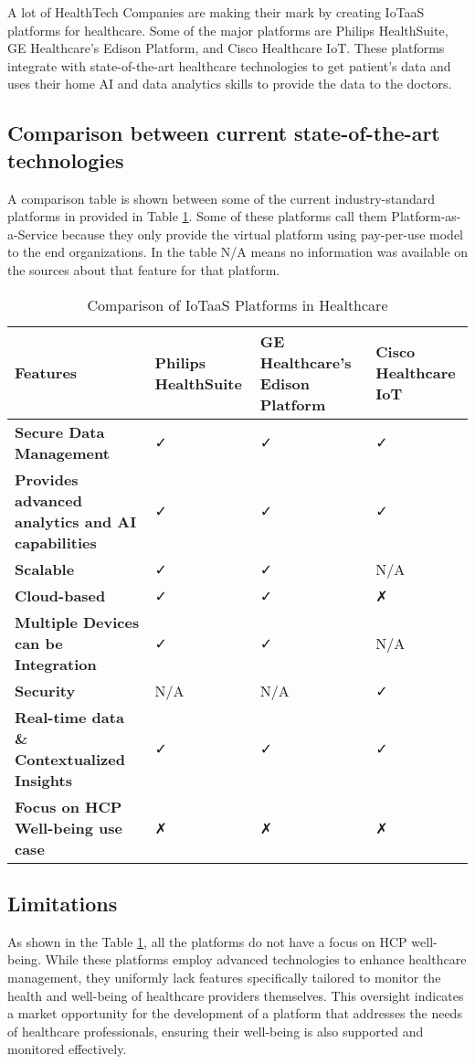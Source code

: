 \noindent A lot of HealthTech Companies are making their mark by creating IoTaaS platforms for healthcare. Some of the major platforms are Philips HealthSuite, GE Healthcare's Edison Platform, and Cisco Healthcare IoT. These platforms integrate with state-of-the-art healthcare technologies to get patient's data and uses their home AI and data analytics skills to provide the data to the doctors. \\

\subsection{Comparison between current state-of-the-art technologies}

\noindent A comparison table is shown between some of the current industry-standard platforms in provided in Table \ref{tab:iot-comparison}. Some of these platforms call them Platform-as-a-Service because they only provide the virtual platform using pay-per-use model to the end organizations. In the table N/A means no information was available on the sources about that feature for that platform. 


\begin{table}[ht]
\centering
\caption{Comparison of IoTaaS Platforms in Healthcare}
\label{tab:iot-comparison}
\begin{tabularx}{\textwidth}{|l|X|X|X|}
\hline
\textbf{Features} & \textbf{Philips HealthSuite} & \textbf{GE Healthcare's Edison Platform} & \textbf{Cisco Healthcare IoT} \\ \hline
\textbf{Secure Data Management} &  ✓ &  ✓ &  ✓ \\ \hline
\textbf{Provides advanced analytics and AI capabilities} &  ✓ &  ✓ &  ✓ \\ \hline
\textbf{Scalable} & ✓ & ✓ & N/A \\ \hline
\textbf{Cloud-based} &  ✓ &  ✓ & ✗ \\ \hline
\textbf{Multiple Devices can be Integration} & ✓ & ✓ & N/A \\ \hline
\textbf{Security} & N/A & N/A & ✓ \\ \hline
\textbf{Real-time data \& Contextualized Insights} & ✓ & ✓ & ✓ \\ \hline
\textbf{Focus on HCP Well-being use case} & ✗ & ✗ & ✗ \\ \hline
\end{tabularx}
\end{table}

\subsection{Limitations}
As shown in the Table \ref{tab:iot-comparison}, all the platforms do not have a focus on HCP well-being. While these platforms employ advanced technologies to enhance healthcare management, they uniformly lack features specifically tailored to monitor the health and well-being of healthcare providers themselves. This oversight indicates a market opportunity for the development of a platform that addresses the needs of healthcare professionals, ensuring their well-being is also supported and monitored effectively.
